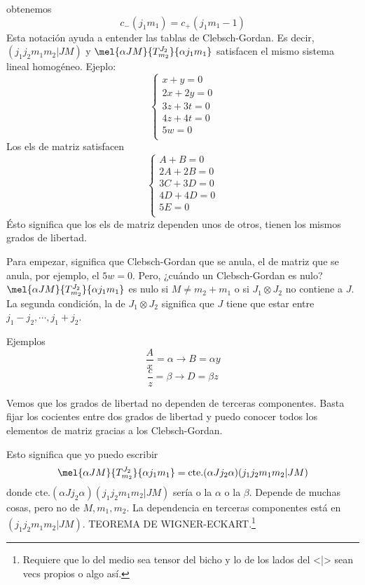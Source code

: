 obtenemos
\begin{equation}
  \boxed{ c_-(j_1 m_1) = c_+ (j_1 m_1 -1)}
\end{equation}
Esta notación ayuda a entender las tablas de Clebsch-Gordan.
Es decir,
$(j_1 j_2 m_1 m_2 | J M)$ y $\mel{\alpha J M}{ T_{m_2}^{J_2}}{\alpha j_1 m_1}$
satisfacen el mismo sistema lineal homogéneo. Ejeplo:
\begin{equation}
  \begin{cases}
    x+y = 0 \\
    2x+2y = 0 \\
    3z+3t = 0 \\
    4z+4t = 0 \\
    5w = 0 \\
  \end{cases}
\end{equation}
Los els de matriz satisfacen
\begin{equation}
  \begin{cases}
    A+B = 0 \\
    2A+2B = 0 \\
    3C+3D = 0 \\
    4D+4D = 0 \\
    5E = 0 \\
  \end{cases}
\end{equation}
Ésto significa que los els de matriz dependen unos de otros, tienen
los mismos grados de libertad.

Para empezar, significa que Clebsch-Gordan que se anula, el de matriz
que se anula, por ejemplo, el $5w=0$. Pero, ¿cuándo un Clebsch-Gordan
es nulo? $\mel{\alpha J M}{ T_{m_2}^{J_2}}{\alpha j_1 m_1}$ es nulo si
$M\neq m_2 + m_1$ o si $J_1 \otimes J_2$ no contiene a $J$. La segunda
condición, la de $J_1 \otimes J_2$ significa que $J$ tiene que estar entre
$j_1-j_2 , \cdots , j_1 + j_2$.

Ejemplos
\begin{equation}
  \frac{A}{x} = \alpha \to B  = \alpha y
\end{equation}
\begin{equation}
  \frac{c}{z} = \beta \to D  = \beta z
\end{equation}

Vemos que los grados de libertad no dependen de terceras componentes.
Basta fijar los cocientes entre dos grados de libertad y puedo conocer
todos los elementos de matriz gracias a los Clebsch-Gordan.

Esto significa que yo puedo escribir
\begin{equation}
  \mel{\alpha J M}{T_{m_2}^{J_2}}{\alpha j_1 m_1} = \text{cte.} (\alpha J j_2 \alpha)(j_1
  j_2 m_1 m_2 | JM)
\end{equation}
donde $\text{cte.}(\alpha J j_2 \alpha)(j_1
  j_2 m_1 m_2 | JM)$ sería o la $\alpha$ o la $\beta$. Depende de muchas cosas,
pero no de $M,m_1,m_2$. La dependencia en terceras componentes está
en $(j_1
j_2 m_1 m_2 | JM)$. TEOREMA DE WIGNER-ECKART.\footnote{Requiere que
  lo del medio sea tensor del bicho y lo de los lados del <|> sean
  vecs propios o algo así.}

